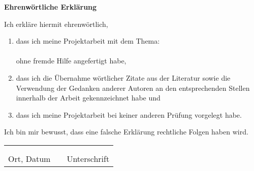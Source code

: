 \documentclass[a4paper, 11pt]{article}
\begin{document}
\begin{center}
  \textbf{Ehrenwörtliche Erklärung}
\end{center}
\vspace*{1.5cm}
Ich erkläre hiermit ehrenwörtlich,
\begin{flushleft}
  \begin{enumerate}[leftmargin=0.5cm]
    \item 	dass ich meine {Projektarbeit}
    mit dem Thema:  \\
    \vspace*{1cm}
            \textbf{\inserttitle} \\
    \vspace*{1cm}
            ohne fremde Hilfe angefertigt habe, \\
    \item	dass ich die Übernahme wörtlicher Zitate aus der Literatur sowie die Verwendung der
            Gedanken anderer Autoren an den entsprechenden Stellen innerhalb der Arbeit gekennzeichnet habe und  \\
    \item	dass ich meine {Projektarbeit}
    bei keiner anderen Prüfung vorgelegt habe. \\
    \vspace*{1cm}
  \end{enumerate}
  \noindent
Ich bin mir bewusst, dass eine falsche Erklärung rechtliche Folgen haben wird.
\end{flushleft}
\vspace*{1cm}
\begin{tabular} {lrl}
  \hspace{5.5cm} & \hspace{3cm} & \hspace{5.5cm} \\
  \hrulefill & & \hrulefill \\
  Ort, Datum & & Unterschrift
\end{tabular}
\vspace*{\fill}
\end{document}
